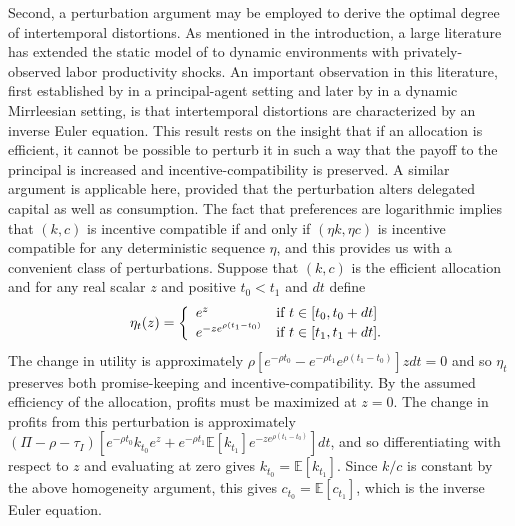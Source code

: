 \documentclass[11pt]{article}
\theoremstyle{plain}
\theoremstyle{definition} %
\begin{document}
Second, a perturbation argument may be employed to derive the optimal degree of intertemporal distortions. As mentioned in the introduction, a large literature has extended the static model of \cite{mirrlees_exploration_1971} to dynamic environments with privately-observed labor productivity shocks. An important observation in this literature, first established by \cite{rogerson_repeated_1985} in a principal-agent setting and later by \cite{golosov_optimal_2003} in a dynamic Mirrleesian setting, is that intertemporal distortions are characterized by an inverse Euler equation. This result rests on the insight that if an allocation is efficient, it cannot be possible to perturb it in such a way that the payoff to the principal is increased and incentive-compatibility is preserved. A similar argument is applicable here, provided that the perturbation alters delegated capital as well as consumption. The fact that preferences are logarithmic implies that $(k,c)$ is incentive compatible if and only if $(\eta k,\eta c)$ is incentive compatible for any deterministic sequence $\eta$, and this provides us with a convenient class of perturbations. Suppose that $(k,c)$ is the efficient allocation and for any real scalar $z$ and positive $t_0 < t_1$ and $dt$ define %
$$
\eta_t(z) = \left\{
\begin{array}{ll}
       e^z & \textnormal{if} \ t \in [t_0,t_0+dt] \\
       e^{-ze^{\rho(t_1-t_0)}}  & \textnormal{if} \ t \in [t_1,t_1+dt].
\end{array}
\right.
$$ %
The change in utility is approximately $\rho [e^{-\rho t_0} - e^{-\rho t_1} e^{\rho(t_1-t_0)}]zdt = 0$ and so $\eta_t$ preserves both promise-keeping and incentive-compatibility. By the assumed efficiency of the allocation, profits must be maximized at $z=0$. The change in profits from this perturbation is approximately $(\Pi - \rho - \tau_I)[e^{-\rho t_0}k_{t_0}e^z + e^{-\rho t_1}\mathbb{E}[k_{t_1}]e^{-ze^{\rho(t_1-t_0)}}]dt$, and so differentiating with respect to $z$ and evaluating at zero gives $k_{t_0} = \mathbb{E}[k_{t_1}]$. Since $k/c$ is constant by the above homogeneity argument, this gives $c_{t_0} = \mathbb{E}{\left[c_{t_1}\right]}$, which is the inverse Euler equation. 
\end{document}
